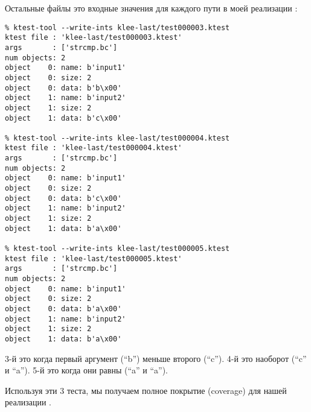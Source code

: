 Остальные файлы это входные значения для каждого пути в моей реализации :

\begin{lstlisting}
% ktest-tool --write-ints klee-last/test000003.ktest
ktest file : 'klee-last/test000003.ktest'
args       : ['strcmp.bc']
num objects: 2
object    0: name: b'input1'
object    0: size: 2
object    0: data: b'b\x00'
object    1: name: b'input2'
object    1: size: 2
object    1: data: b'c\x00'

% ktest-tool --write-ints klee-last/test000004.ktest
ktest file : 'klee-last/test000004.ktest'
args       : ['strcmp.bc']
num objects: 2
object    0: name: b'input1'
object    0: size: 2
object    0: data: b'c\x00'
object    1: name: b'input2'
object    1: size: 2
object    1: data: b'a\x00'

% ktest-tool --write-ints klee-last/test000005.ktest
ktest file : 'klee-last/test000005.ktest'
args       : ['strcmp.bc']
num objects: 2
object    0: name: b'input1'
object    0: size: 2
object    0: data: b'a\x00'
object    1: name: b'input2'
object    1: size: 2
object    1: data: b'a\x00'
\end{lstlisting}

3-й это когда первый аргумент (``b'') меньше второго (``c'').
4-й это наоборот (``c'' и ``a'').
5-й это когда они равны (``a'' и ``a'').

Используя эти 3 теста, мы получаем полное покрытие (coverage) для нашей реализации .

